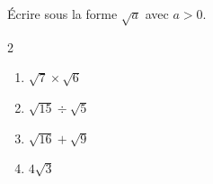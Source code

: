 \begin{exo}{}
	Écrire sous la forme $\sqrt{a}$ avec $a > 0$.
	\vspace*{-2mm}\begin{multicols}{2}
		\begin{enumerate}[itemsep=2mm]
			\item $\sqrt{7} \times \sqrt{6}$
			\item $\sqrt{15} \div \sqrt{5}$
			\item $\sqrt{16} + \sqrt{9}$
			\item $4\sqrt{3}$
		\end{enumerate}
	\end{multicols}\vspace*{-2mm}
\end{exo}
